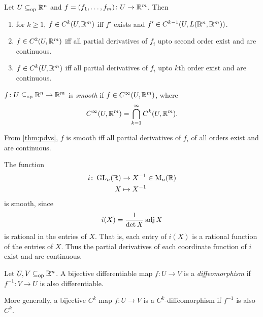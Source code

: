 \begin{theorem} \label{thm:pdvs}
    Let $U \subseteq_{\mathrm{op}} \mathbb{R}^n$ and $f = (f_1, \dots, f_m)\colon U \to \mathbb{R}^m$.
    Then
    \begin{enumerate}
        \item for $k \ge 1$, $f \in C^k(U, \mathbb{R}^m)$ iff $f'$ exists and
        $f' \in C^{k-1}(U, L(\mathbb{R}^n, \mathbb{R}^m))$.
        \item $f \in C^2(U, \mathbb{R}^m)$ iff all partial derivatives of $f_i$
        upto second order exist and are continuous.
        \item $f \in C^k(U, \mathbb{R}^m)$ iff all partial derivatives of $f_i$
        upto $k$th order exist and are continuous.
    \end{enumerate}
\end{theorem}

\begin{definition*}[smoothness] \label{def:smooth}
    $f\colon U \subseteq_{\mathrm{op}} \mathbb{R}^n \to \mathbb{R}^m$ is \emph{smooth} if
    $f \in C^\infty(U, \mathbb{R}^m)$, where \[
        C^\infty(U, \mathbb{R}^m) = \bigcap_{k=1}^\infty C^k(U, \mathbb{R}^m).
    \]
\end{definition*}

\begin{corollary} \label{thm:pdvs:smooth}
    From \cref{thm:pdvs}, $f$ is smooth iff all partial derivatives of $f_i$
    of all orders exist and are continuous.
\end{corollary}

\begin{example}
    The function \begin{align*}
        i\colon \operatorname{GL}_n(\mathbb{R}) &\to X^{-1} \in \operatorname{M}_n(\mathbb{R}) \\
        X &\mapsto X^{-1}
    \end{align*}
    is smooth, since \[
        i(X) = \frac{1}{\det X} \operatorname{adj} X
    \] is rational in the entries of $X$.
    That is, each entry of $i(X)$ is a rational function of the entries of
    $X$.
    Thus the partial derivatives of each coordinate function of $i$ exist
    and are continuous.
\end{example}

\begin{definition*}[diffeomorphism] \label{def:diffeo}
    Let $U, V \subseteq_{\mathrm{op}} \mathbb{R}^n$.
    A bijective differentiable map $f\colon U \to V$ is a
    \emph{diffeomorphism} if $f^{-1}\colon V \to U$ is also differentiable.

    More generally, a bijective $C^k$ map $f\colon U \to V$ is a
    $C^k$-diffeomorphism if $f^{-1}$ is also $C^k$.
\end{definition*}

